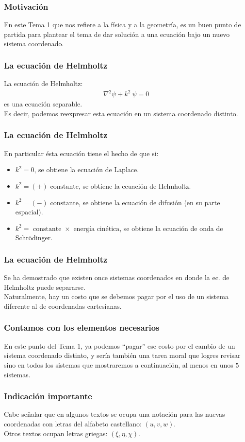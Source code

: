 \documentclass[12pt]{beamer}
\begin{document}
\begin{frame}
\frametitle{Motivación}
En este Tema 1 que nos refiere a la física y a la geometría, es un buen punto de partida para plantear el tema de dar solución a una ecuación bajo un nuevo sistema coordenado.
\end{frame}
\begin{frame}
\frametitle{La ecuación de Helmholtz}
La ecuación de Helmholtz:
\pause
\begin{align*}
\nabla^{2} \psi + k^{2} \: \psi = 0
\end{align*}
es una ecuación separable.
\\
\bigskip
\pause
Es decir, podemos reexpresar esta ecuación en un sistema coordenado distinto.
\end{frame}
\begin{frame}
\frametitle{La ecuación de Helmholtz}
En particular ésta ecuación tiene el hecho de que si:
\pause
\begin{itemize}[<+->]
\item $k^{2} = 0$, se obtiene la ecuación de Laplace.
\item $k^{2} = (+) \mbox{ constante}$, se obtiene la ecuación de Helmholtz.
\item $k^{2} = (-) \mbox{ constante}$, se obtiene la ecuación de difusión (en su parte espacial).
\item $k^{2} = \mbox{ constante } \times \mbox{ energía cinética}$, se obtiene la ecuación de onda de Schrödinger.
\end{itemize}
\end{frame}
\begin{frame}
\frametitle{La ecuación de Helmholtz}
Se ha demostrado que existen once sistemas coordenados en donde la ec. de Helmholtz puede separarse. 
\\
\bigskip
\pause
Naturalmente, hay un costo que se debemos pagar por el uso de un sistema diferente al de coordenadas cartesianas.
\end{frame}
\begin{frame}
\frametitle{Contamos con los elementos necesarios}
En este punto del Tema 1, ya podemos \enquote{pagar} ese costo por el cambio de un sistema coordenado distinto, y sería también una tarea moral que logres revisar sino en todos los sistemas que mostraremos a continuación, al menos en unos $5$ sistemas.
\end{frame}
\begin{frame}
\frametitle{Indicación importante}
Cabe señalar que en algunos textos se ocupa una notación para las nuevas coordenadas con letras del alfabeto castellano: $(u,v,w)$.
\\
\bigskip
\pause
Otros textos ocupan letras griegas: $(\xi, \eta, \chi)$.
\end{frame}
\end{document}
